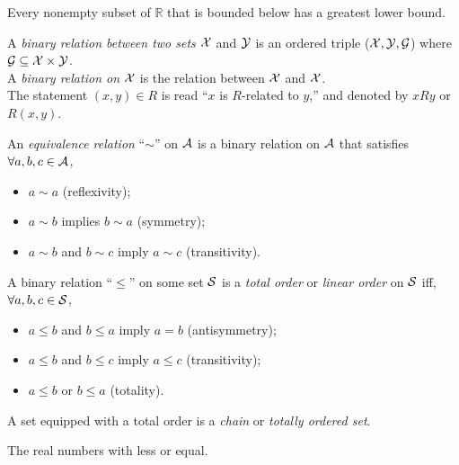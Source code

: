 \begin{coro}
  Every nonempty subset of $\mathbb{R}$ %
  that is bounded below has a greatest lower bound.
\end{coro}

\begin{defn}
  A \emph{binary relation between two sets} ${\cal X}$ and ${\cal Y}$
  is an ordered triple
  (${\cal X}, {\cal Y}, {\cal G}$)
  where ${\cal G}\subseteq{\cal X}\times{\cal Y}$.\\
  A \emph{binary relation on} ${\cal X}$
  is the relation between ${\cal X}$ and ${\cal X}$.\\
  The statement $(x,y)\in R$ is read
  ``$x$ is $R$-related to $y$,'' and
  denoted by $xRy$ or $R(x,y)$.
\end{defn}

\begin{defn}
  An \emph{equivalence relation} ``$\sim$'' on ${\cal A}$ is 
  a binary relation on ${\cal A}$ 
  that satisfies
  $\forall a,b,c\in{\cal A}$,
  \begin{itemize}
    \itemsep0em
  \item $a\sim a$ (reflexivity);
  \item $a\sim b$ implies $b\sim a$ (symmetry);
  \item $a\sim b$ and $b\sim c$ imply $a\sim c$ (transitivity).
  \end{itemize}
\end{defn}

\begin{defn}
  \label{defn:totalOrder}
  A binary relation ``$\le$'' on some set ${\cal S}$
  is a \emph{total order} or \emph{linear order} on ${\cal S}$
  iff,
  $\forall a,b,c\in{\cal S}$,
  \begin{itemize}
  \item $a\le b$ and $b\le a$ imply $a=b$ (antisymmetry);
  \item $a\le b$ and $b\le c$ imply $a\le c$ (transitivity);
  \item $a\le b$ or $b\le a$ (totality).
  \end{itemize}
  A set equipped with a total order
  is a \emph{chain} or \emph{totally ordered set}.
\end{defn}

\begin{exm}
  The real numbers with less or equal.
\end{exm}

